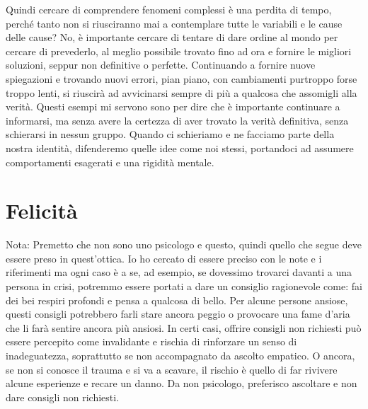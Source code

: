 \documentclass[12pt]{book} %
\begin{document}
\begin{mdframed}[linewidth=1pt]
Quindi cercare di comprendere fenomeni complessi è una perdita di tempo, perché tanto non si riusciranno mai a contemplare tutte le variabili e le cause delle cause? No, è importante cercare di tentare di dare ordine al mondo per cercare di prevederlo, al meglio possibile trovato fino ad ora e fornire le migliori soluzioni, seppur non definitive o perfette.
Continuando a fornire nuove spiegazioni e trovando nuovi errori, pian piano, con cambiamenti purtroppo forse troppo lenti, si riuscirà ad avvicinarsi sempre di più a qualcosa che assomigli alla verità.
Questi esempi mi servono sono per dire che è importante continuare a informarsi, ma senza avere la certezza di aver trovato la verità definitiva, senza schierarsi in nessun gruppo. Quando ci schieriamo e ne facciamo parte della nostra identità, difenderemo quelle idee come noi stessi, portandoci ad assumere comportamenti esagerati e una rigidità mentale.
\end{mdframed}

\clearpage\section{Felicità}
\begin{mdframed}[linewidth=1pt]
Nota: Premetto che non sono uno psicologo e questo, quindi quello che segue deve essere preso in
quest'ottica. Io ho cercato di essere preciso con le note e i riferimenti ma ogni caso è a se, ad
esempio, se dovessimo trovarci davanti a una persona in crisi, potremmo essere portati a dare un consiglio ragionevole
come: fai dei bei respiri profondi e pensa a qualcosa di bello. Per alcune persone ansiose, questi consigli potrebbero
farli stare ancora peggio o provocare una fame d'aria che li farà sentire ancora più ansiosi.
In certi casi, offrire consigli non richiesti può essere percepito come invalidante e rischia di rinforzare un senso di inadeguatezza, soprattutto se non accompagnato da ascolto empatico. O ancora, se non si conosce il trauma e si va a scavare, il rischio è quello di far rivivere alcune esperienze e recare
un danno. Da non psicologo, preferisco ascoltare e non dare consigli non richiesti.
\end{mdframed}
\end{document}
